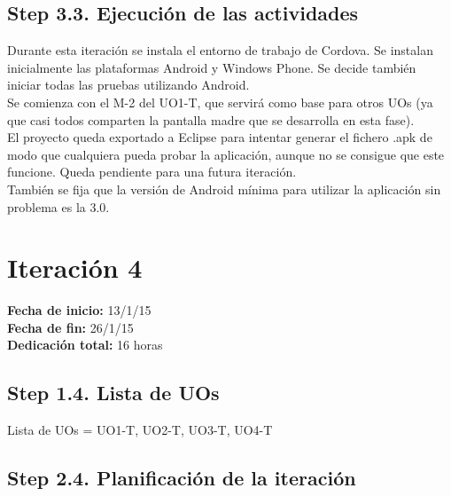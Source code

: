 \subsection{Step 3.3. Ejecución de las actividades}
\label{it2:3.3}

Durante esta iteración se instala el entorno de trabajo de Cordova. Se instalan inicialmente las plataformas Android y Windows Phone. Se decide también iniciar todas las pruebas utilizando Android.\\

Se comienza con el M-2 del UO1-T, que servirá como base para otros UOs (ya que casi todos comparten la pantalla madre que se desarrolla en esta fase).\\

El proyecto queda exportado a Eclipse para intentar generar el fichero .apk de modo que cualquiera pueda probar la aplicación, aunque no se consigue que este funcione. Queda pendiente para una futura iteración.\\

También se fija que la versión de Android mínima para utilizar la aplicación sin problema es la 3.0.\\


\section{Iteración 4}
\label{it4}

\begin{flushleft}
\textbf{Fecha de inicio:} 13/1/15\\
\textbf{Fecha de fin:} 26/1/15\\
\textbf{Dedicación total:} 16 horas\\
\end{flushleft}

\subsection{Step 1.4. Lista de UOs}
\label{it4:1.4}

Lista de UOs = {UO1-T, UO2-T, UO3-T, UO4-T}

\subsection{Step 2.4. Planificación de la iteración}
\label{it4:2.4}

